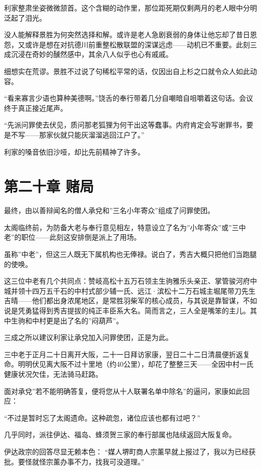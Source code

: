 \documentclass[
]{article}
\begin{document}
利家整肃坐姿微微颔首。这个含糊的动作里，那位距死期仅剩两月的老人眼中分明泛起了泪光。

没人能解释景胜为何突然选择和解。或许是老人急剧衰弱的身体让他忘却了昔日恩怨，又或许是想在对抗德川前重整松散联盟的深谋远虑------动机已不重要。此刻三成沉浸在奇妙的醺然感中，其余八人似乎也心有戚戚。

细想实在荒谬。景胜不过说了句稀松平常的话，仅因出自上杉之口就令众人如此动容。

``看来寡言少语也算种美德啊。''饶舌的奉行带着几分自嘲暗自咀嚼着这句话。会议终于真正接近尾声。

``先派问罪使去伏见，质问那老狐狸为何干出这等蠢事。内府肯定会写谢罪书，要是不写------那家伙就只能灰溜溜逃回江户了。''

利家的嗓音依旧沙哑，却比先前精神了许多。

\section*{第二十章 赌局}\label{ux7b2cux4e8cux5341ux7ae0-ux8d4cux5c40}

最终，由以善辩闻名的僧人承兌和''三名小年寄众''组成了问罪使团。

太阁临终前，为防备大老与奉行意见相左，特意设立了名为''小年寄众''或''三中老''的职位------此刻这安排倒是派上了用场。

虽称''中老''，但这三人既无下属机构也无俸禄。说白了，秀吉大概只把他们当跑腿的使唤。

这三位中老有几个共同点：赞岐高松十五万石领主生驹雅乐头亲正、掌管骏河府中城并领十四万五千石的中村式部少辅一氏、远江·滨松十二万石城主堀尾带刀先生吉晴------他们都出身浓尾地区，是常胜羽柴军的核心成员，与其说是靠智谋，不如说是凭勇猛得到秀吉提拔的纯正丰臣系大名。简而言之，三人全是嘴笨的主儿。其中生驹和中村更是出了名的''闷葫芦''。

三成之所以建议利家让承兌加入问罪使团，正是为此。

三中老于正月二十日离开大阪，二十一日拜访家康，翌日二十二日清晨便折返复命。明明伏见离大阪不过十里地（约40公里），却花了整整三天------全因中村一氏健康状况欠佳，无法骑马赶路。

面对承兌''若不能明确答复，便将您从十人联署名单中除名''的逼问，家康如此回应：

``不过是暂时忘了太阁遗命。这种疏忽，诸位应该也都有过吧？''

几乎同时，派往伊达、福岛、蜂须贺三家的奉行部属也陆续返回大阪复命。

伊达政宗的回答尽显无赖本色：
``媒人堺町商人宗薰早就上报过了，我以为已经获批。要怪就怪宗薰办事不力，找我可没道理。''
\end{document}
